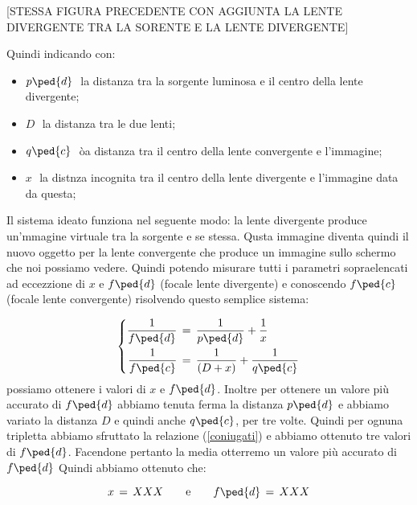 [STESSA FIGURA PRECEDENTE CON AGGIUNTA LA LENTE DIVERGENTE TRA LA SORENTE E LA LENTE DIVERGENTE]

Quindi indicando con:
\begin{itemize}
	\item{$p\ped{d}\,\,$ la distanza tra la sorgente luminosa e il centro della lente divergente;}
	\item{$D\,\,$ la distanza tra le due lenti;}
	\item{$q\ped{c}\,\,$ òa distanza tra il centro della lente convergente e l'immagine;}
	\item{$x\,\,$ la distnza incognita tra il centro della lente divergente e l'immagine data da questa;}
\end{itemize}
Il sistema ideato funziona nel seguente modo: la lente divergente produce un'mmagine virtuale tra la sorgente e se stessa. Qusta immagine diventa quindi il nuovo oggetto per la lente convergente che produce un immagine sullo schermo che noi possiamo vedere. Quindi potendo misurare tutti i parametri sopraelencati ad eccezzione di $x$ e $f\ped{d}$ (focale lente divergente) e conoscendo $f\ped{c}$ (focale lente convergente) risolvendo questo semplice sistema:

\begin{equation}
 \left\{
  \begin{aligned}
    \frac{1}{f\ped{d}} & \,=\, \frac{1}{p\ped{d}} + \frac{1}{x}\\
    \frac{1}{f\ped{c}} & \,=\, \frac{1}{(D + x)} + \frac{1}{q\ped{c}}
  \end{aligned}
\right.
\end{equation}
%
possiamo ottenere i valori di $x$ e $f\ped{d}$. Inoltre per ottenere un valore più accurato di $f\ped{d}$ abbiamo tenuta ferma la distanza $p\ped{d}$ e abbiamo variato la distanza $D$ e quindi anche $q\ped{c}$, per tre volte. Quindi per ognuna tripletta abbiamo sfruttato la relazione (\ref{coniugati}) e abbiamo ottenuto tre valori di $f\ped{d}$. Facendone pertanto la media otterremo un valore più accurato di $f\ped{d}$
Quindi abbiamo ottenuto che:

\begin{equation}
	x \,=\, XXX \qquad \text{e} \qquad f\ped{d} \,=\, XXX
\end{equation}

